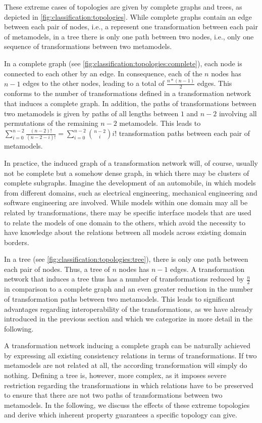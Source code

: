 These extreme cases of topologies are given by complete graphs and trees, as depicted in \autoref{fig:classification:topologies}.
While complete graphs contain an edge between each pair of nodes, i.e., a represent one transformation between each pair of metamodels, in a tree there is only one path between two nodes, i.e., only one sequence of transformations between two metamodels.

In a complete graph (see \autoref{fig:classification:topologies:complete}), each node is connected to each other by an edge.
In consequence, each of the $n$ nodes has $n-1$ edges to the other nodes, leading to a total of $\frac{n*(n-1)}{2}$ edges.
This conforms to the number of transformations defined in a transformation network that induces a complete graph.
In addition, the paths of transformations between two metamodels is given by paths of all lengths between $1$ and $n-2$ involving all permutations of the remaining $n-2$ metamodels.
This leads to $\sum_{i=0}^{n-2} \frac{(n-2)!}{(n-2-i)!} = \sum_{i=0}^{n-2} \binom{n-2}{i} i!$ transformation paths between each pair of metamodels.

In practice, the induced graph of a transformation network will, of course, usually not be complete but a somehow dense graph, in which there may be clusters of complete subgraphs.
Imagine the development of an automobile, in which models from different domains, such as electrical engineering, mechanical engineering and software engineering are involved. 
While models within one domain may all be related by transformations, there may be specific interface models that are used to relate the models of one domain to the others, which avoid the necessity to have knowledge about the relations between all models across existing domain borders.

In a tree (see \autoref{fig:classification:topologies:tree}), there is only one path between each pair of nodes.
Thus, a tree of $n$ nodes has $n-1$ edges.
A transformation network that induces a tree thus has a number of transformations reduced by $\frac{n}{2}$ in comparison to a complete graph and an even greater reduction in the number of transformation paths between two metamodels.
This leads to significant advantages regarding interoperability of the transformations, as we have already introduced in the previous section and which we categorize in more detail in the following.

A transformation network inducing a complete graph can be naturally achieved by expressing all existing consistency relations in terms of transformations.
If two metamodels are not related at all, the according transformation will simply do nothing.
Defining a tree is, however, more complex, as it imposes severe restriction regarding the transformations in which relations have to be preserved to ensure that there are not two paths of transformations between two metamodels.
In the following, we discuss the effects of these extreme topologies and derive which inherent property guarantees a specific topology can give.


